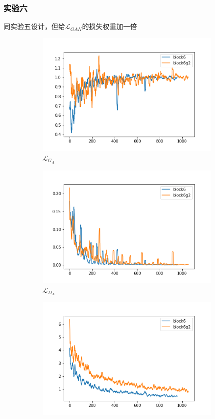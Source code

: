 \documentclass{beamer}
\begin{document}
\begin{frame}
\frametitle{实验六}
同实验五设计，但给$\mathcal{L}_{GAN}$的损失权重加一倍
\begin{figure}[htb]
    \centering
    \begin{subfigure}[b]{0.23\linewidth}
        \includegraphics[width=\linewidth]{exp6_G_A.png}
        \caption{$\mathcal{L}_{G_A}$}
      \end{subfigure}
      \begin{subfigure}[b]{0.23\linewidth}
        \includegraphics[width=\linewidth]{exp6_D_A.png}
        \caption{$\mathcal{L}_{D_A}$}
      \end{subfigure}
      \begin{subfigure}[b]{0.23\linewidth}
        \includegraphics[width=\linewidth]{exp6_cycle_A.png}

\end{subfigure}
\end{figure}
\end{frame}
\end{document}
